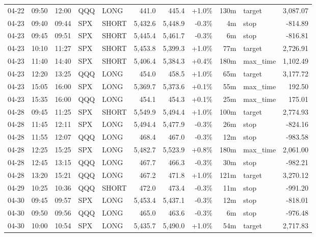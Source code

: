 \documentclass[11pt,a4paper,twoside]{article}
\begin{document}
\begin{center}
\begin{longtable}{>{\color{txtmain}}l l l l l r r r r >{\color{txtmain}}l r}
04-22 & 09:50 & 12:00 & QQQ & LONG & 441.0 & 445.4 & \textcolor{wingreen}{+1.0\%} & 130m & target & \textcolor{wingreen}{3,087.07} \\
04-23 & 09:40 & 09:44 & SPX & SHORT & 5,432.6 & 5,448.9 & \textcolor{lossred}{-0.3\%} & 4m & stop & \textcolor{lossred}{-814.89} \\
04-23 & 09:45 & 09:51 & SPX & SHORT & 5,445.4 & 5,461.7 & \textcolor{lossred}{-0.3\%} & 6m & stop & \textcolor{lossred}{-816.81} \\
04-23 & 10:10 & 11:27 & SPX & SHORT & 5,453.8 & 5,399.3 & \textcolor{wingreen}{+1.0\%} & 77m & target & \textcolor{wingreen}{2,726.91} \\
04-23 & 11:40 & 14:40 & SPX & SHORT & 5,406.4 & 5,384.3 & \textcolor{wingreen}{+0.4\%} & 180m & max\_time & \textcolor{wingreen}{1,102.49} \\
04-23 & 12:20 & 13:25 & QQQ & LONG & 454.0 & 458.5 & \textcolor{wingreen}{+1.0\%} & 65m & target & \textcolor{wingreen}{3,177.72} \\
04-23 & 15:05 & 16:00 & SPX & LONG & 5,369.7 & 5,373.6 & \textcolor{wingreen}{+0.1\%} & 55m & max\_time & \textcolor{wingreen}{192.50} \\
04-23 & 15:35 & 16:00 & QQQ & LONG & 454.1 & 454.3 & \textcolor{wingreen}{+0.1\%} & 25m & max\_time & \textcolor{wingreen}{175.01} \\
04-28 & 09:45 & 11:25 & SPX & SHORT & 5,549.9 & 5,494.4 & \textcolor{wingreen}{+1.0\%} & 100m & target & \textcolor{wingreen}{2,774.93} \\
04-28 & 11:45 & 12:11 & SPX & LONG & 5,494.4 & 5,477.9 & \textcolor{lossred}{-0.3\%} & 26m & stop & \textcolor{lossred}{-824.16} \\
04-28 & 11:55 & 12:07 & QQQ & LONG & 468.4 & 467.0 & \textcolor{lossred}{-0.3\%} & 12m & stop & \textcolor{lossred}{-983.58} \\
04-28 & 12:25 & 15:25 & SPX & LONG & 5,482.7 & 5,523.9 & \textcolor{wingreen}{+0.8\%} & 180m & max\_time & \textcolor{wingreen}{2,061.00} \\
04-28 & 12:45 & 13:15 & QQQ & LONG & 467.7 & 466.3 & \textcolor{lossred}{-0.3\%} & 30m & stop & \textcolor{lossred}{-982.21} \\
04-28 & 13:20 & 15:21 & QQQ & LONG & 467.2 & 471.8 & \textcolor{wingreen}{+1.0\%} & 121m & target & \textcolor{wingreen}{3,270.12} \\
04-29 & 10:25 & 10:36 & QQQ & SHORT & 472.0 & 473.4 & \textcolor{lossred}{-0.3\%} & 11m & stop & \textcolor{lossred}{-991.20} \\
04-30 & 09:45 & 09:57 & SPX & LONG & 5,453.4 & 5,437.1 & \textcolor{lossred}{-0.3\%} & 12m & stop & \textcolor{lossred}{-818.01} \\
04-30 & 09:50 & 09:56 & QQQ & LONG & 465.0 & 463.6 & \textcolor{lossred}{-0.3\%} & 6m & stop & \textcolor{lossred}{-976.48} \\
04-30 & 10:00 & 10:54 & SPX & LONG & 5,435.7 & 5,490.0 & \textcolor{wingreen}{+1.0\%} & 54m & target & \textcolor{wingreen}{2,717.83} \\
\end{longtable}
\end{center}
\clearpage
\end{document}
